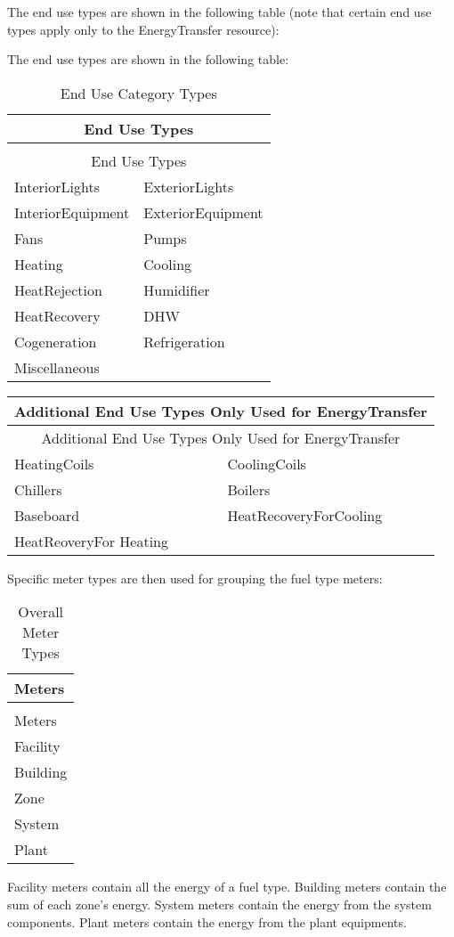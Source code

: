 The end use types are shown in the following table (note that certain end use types apply only to the EnergyTransfer resource):

The end use types are shown in the following table:

\begin{longtable}[c]{@{}ll@{}}
\caption{End Use Category Types \label{table:end-use-category-types}} \tabularnewline
\toprule 
\multicolumn{2}{c}{End Use Types} \tabularnewline
\midrule
\endfirsthead

\caption[]{End Use Category Types} \tabularnewline
\toprule 
\multicolumn{2}{c}{End Use Types} \tabularnewline
\midrule
\endhead

  InteriorLights & ExteriorLights \tabularnewline
  InteriorEquipment & ExteriorEquipment \tabularnewline
  Fans & Pumps \tabularnewline
  Heating & Cooling \tabularnewline
  HeatRejection & Humidifier \tabularnewline
  HeatRecovery & DHW \tabularnewline
  Cogeneration & Refrigeration \tabularnewline
  Miscellaneous & \tabularnewline
\bottomrule
\end{longtable}

\begin{longtable}[c]{@{}ll@{}}
\toprule 
\multicolumn{2}{c}{Additional End Use Types Only Used for EnergyTransfer} \tabularnewline
\midrule
\endfirsthead

\toprule 
\multicolumn{2}{c}{Additional End Use Types Only Used for EnergyTransfer} \tabularnewline
\midrule
\endhead

HeatingCoils & CoolingCoils \tabularnewline
Chillers & Boilers \tabularnewline
Baseboard & HeatRecoveryForCooling \tabularnewline
HeatReoveryFor Heating & \tabularnewline
\bottomrule
\end{longtable}

Specific meter types are then used for grouping the fuel type meters:

\begin{longtable}[c]{@{}l@{}}
\caption{Overall Meter Types \label{table:overall-meter-types}} \tabularnewline
\toprule 
Meters \tabularnewline
\midrule
\endfirsthead

\caption[]{Overall Meter Types} \tabularnewline
\toprule 
Meters \tabularnewline
\midrule
\endhead

Facility \tabularnewline
Building \tabularnewline
Zone \tabularnewline
System \tabularnewline
Plant \tabularnewline
\bottomrule
\end{longtable}

Facility meters contain all the energy of a fuel type. Building meters contain the sum of each zone’s energy. System meters contain the energy from the system components. Plant meters contain the energy from the plant equipments.

